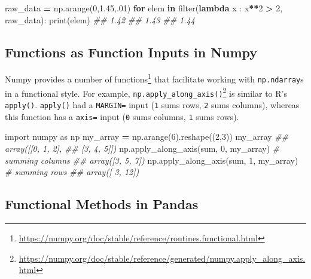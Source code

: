\documentclass[12pt,krantz2]{krantz}
\makeatletter
\newenvironment{Shaded}{\begin{snugshade}}{\end{snugshade}}
\newcommand{\BuiltInTok}[1]{#1}
\newcommand{\CommentTok}[1]{\textcolor[rgb]{0.37,0.37,0.37}{\textit{#1}}}
\newcommand{\ControlFlowTok}[1]{\textcolor[rgb]{0.27,0.27,0.27}{\textbf{#1}}}
\newcommand{\DecValTok}[1]{\textcolor[rgb]{0.06,0.06,0.06}{#1}}
\newcommand{\FloatTok}[1]{\textcolor[rgb]{0.06,0.06,0.06}{#1}}
\newcommand{\ImportTok}[1]{#1}
\newcommand{\KeywordTok}[1]{\textcolor[rgb]{0.27,0.27,0.27}{\textbf{#1}}}
\newcommand{\NormalTok}[1]{#1}
\newcommand{\OperatorTok}[1]{\textcolor[rgb]{0.43,0.43,0.43}{\textbf{#1}}}
\renewcommand{\href}[2]{#2\footnote{\url{#1}}}
\newenvironment{kframe}{%
\medskip{}
\setlength{\fboxsep}{.8em}
 \def\at@end@of@kframe{}%
 \ifinner\ifhmode%
  \def\at@end@of@kframe{\end{minipage}}%
  \begin{minipage}{\columnwidth}%
 \fi\fi%
 \def\FrameCommand##1{\hskip\@totalleftmargin \hskip-\fboxsep
 \colorbox{shadecolor}{##1}\hskip-\fboxsep
     \hskip-\linewidth \hskip-\@totalleftmargin \hskip\columnwidth}%
 \MakeFramed {\advance\hsize-\width
   \@totalleftmargin\z@ \linewidth\hsize
   \@setminipage}}%
 {\par\unskip\endMakeFramed%
 \at@end@of@kframe}
\renewenvironment{Shaded}{\begin{kframe}}{\end{kframe}}
\makeatother
\begin{document}
\begin{Shaded}
\begin{Highlighting}[]
\NormalTok{raw_data }\OperatorTok{=}\NormalTok{ np.arange(}\DecValTok{0}\NormalTok{,}\FloatTok{1.45}\NormalTok{,.}\DecValTok{01}\NormalTok{)}
\ControlFlowTok{for}\NormalTok{ elem }\KeywordTok{in} \BuiltInTok{filter}\NormalTok{(}\KeywordTok{lambda}\NormalTok{ x : x}\OperatorTok{**}\DecValTok{2} \OperatorTok{>} \DecValTok{2}\NormalTok{, raw_data):}
    \BuiltInTok{print}\NormalTok{(elem)}
\CommentTok{## 1.42}
\CommentTok{## 1.43}
\CommentTok{## 1.44}
\end{Highlighting}
\end{Shaded}

\hypertarget{functions-as-function-inputs-in-numpy}{%
\subsection{Functions as Function Inputs in Numpy}\label{functions-as-function-inputs-in-numpy}}

Numpy provides a \href{https://numpy.org/doc/stable/reference/routines.functional.html}{number of functions} that facilitate working with \texttt{np.ndarray}s in a functional style. For example, \href{https://numpy.org/doc/stable/reference/generated/numpy.apply_along_axis.html}{\texttt{np.apply\_along\_axis()}} is similar to R's \texttt{apply()}. \texttt{apply()} had a \texttt{MARGIN=} input (\texttt{1} sums rows, \texttt{2} sums columns), whereas this function has a \texttt{axis=} input (\texttt{0} sums columns, \texttt{1} sums rows).

\begin{Shaded}
\begin{Highlighting}[]
\ImportTok{import}\NormalTok{ numpy }\ImportTok{as}\NormalTok{ np}
\NormalTok{my_array }\OperatorTok{=}\NormalTok{ np.arange(}\DecValTok{6}\NormalTok{).reshape((}\DecValTok{2}\NormalTok{,}\DecValTok{3}\NormalTok{))}
\NormalTok{my_array}
\CommentTok{## array([[0, 1, 2],}
\CommentTok{##        [3, 4, 5]])}
\NormalTok{np.apply_along_axis(}\BuiltInTok{sum}\NormalTok{, }\DecValTok{0}\NormalTok{, my_array) }\CommentTok{# summing columns}
\CommentTok{## array([3, 5, 7])}
\NormalTok{np.apply_along_axis(}\BuiltInTok{sum}\NormalTok{, }\DecValTok{1}\NormalTok{, my_array) }\CommentTok{# summing rows}
\CommentTok{## array([ 3, 12])}
\end{Highlighting}
\end{Shaded}

\hypertarget{functional-methods-in-pandas}{%
\subsection{Functional Methods in Pandas}\label{functional-methods-in-pandas}}
\end{document}
